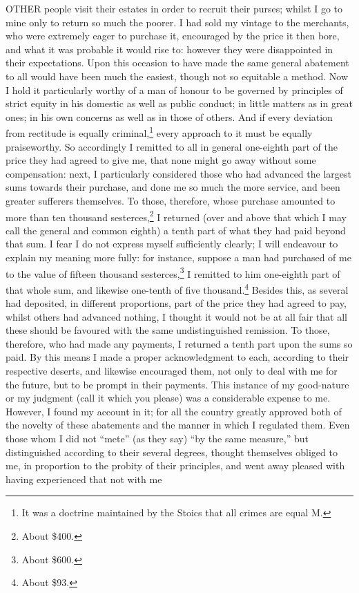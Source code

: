 OTHER people visit their estates in order to recruit their purses; whilst
I go to mine only to return so much the poorer. I had sold my vintage to
the merchants, who were extremely eager to purchase it, encouraged by the
price it then bore, and what it was probable it would rise to: however
they were disappointed in their expectations. Upon this occasion to have
made the same general abatement to all would have been much the easiest,
though not so equitable a method. Now I hold it particularly worthy of a
man of honour to be governed by principles of strict equity in his
domestic as well as public conduct; in little matters as in great ones; in
his own concerns as well as in those of others. And if every deviation
from rectitude is equally criminal,\footnote{It was a doctrine
maintained by the Stoics that all crimes are equal M.} every approach to it
must be equally praiseworthy. So accordingly I remitted to all in general
one-eighth part of the price they had agreed to give me, that none might
go away without some compensation: next, I particularly considered those
who had advanced the largest sums towards their purchase, and done me so
much the more service, and been greater sufferers themselves. To those,
therefore, whose purchase amounted to more than ten thousand sesterces,\footnote{About \$400.}
I returned (over and above that which I may call the general and common
eighth) a tenth part of what they had paid beyond that sum. I fear I do
not express myself sufficiently clearly; I will endeavour to explain my
meaning more fully: for instance, suppose a man had purchased of me to the
value of fifteen thousand sesterces,\footnote{About \$600.} I remitted to him
one-eighth part of that whole sum, and likewise one-tenth of five
thousand.\footnote{About \$93.} Besides this, as several had deposited, in
different proportions, part of the price they had agreed to pay, whilst
others had advanced nothing, I thought it would not be at all fair that
all these should be favoured with the same undistinguished remission. To
those, therefore, who had made any payments, I returned a tenth part upon
the sums so paid. By this means I made a proper acknowledgment to each,
according to their respective deserts, and likewise encouraged them, not
only to deal with me for the future, but to be prompt in their payments.
This instance of my good-nature or my judgment (call it which you please)
was a considerable expense to me. However, I found my account in it; for
all the country greatly approved both of the novelty of these abatements
and the manner in which I regulated them. Even those whom I did not ``mete''
(as they say) ``by the same measure,'' but distinguished according to their
several degrees, thought themselves obliged to me, in proportion to the
probity of their principles, and went away pleased with having experienced
that not with me

